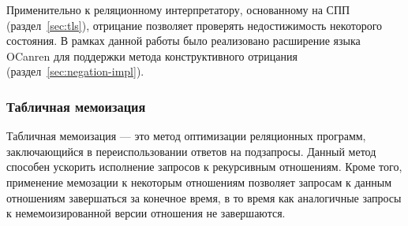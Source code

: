 Применительно к реляционному интерпретатору,
основанному на СПП (раздел~\ref{sec:tls}),
отрицание позволяет проверять недостижимость некоторого состояния.
В рамках данной работы было реализовано расширение 
языка OCanren для поддержки метода конструктивного отрицания (раздел~\ref{sec:negation-impl}).

\subsubsection{Табличная мемоизация}

\label{sec:tabling}

Табличная мемоизация --- это метод оптимизации реляционных программ,
заключающийся в переиспользовании ответов на подзапросы.
Данный метод способен ускорить исполнение запросов к рекурсивным отношениям.
Кроме того, применение мемозации к некоторым отношениям 
позволяет запросам к данным отношениям завершаться за конечное время, 
в то время как аналогичные запросы к немемоизированной версии отношения 
не завершаются.


